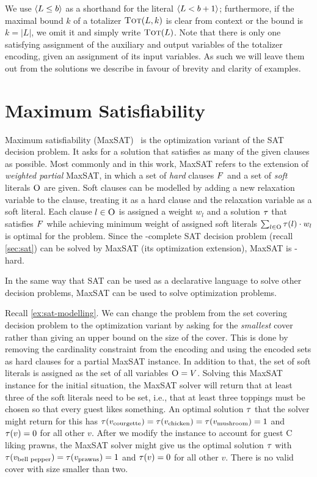 We use $\langle L \leq b \rangle$ as a shorthand for the literal $\langle L < b+1 \rangle$;
furthermore, if the maximal bound $k$ of a totalizer $\textsc{Tot}(L,k)$ is clear from context or the bound is $k=|L|$, we omit it and simply write $\textsc{Tot}(L)$.
Note that there is only one satisfying assignment of the auxiliary and output variables of the totalizer encoding, given an assignment of its input variables.
As such we will leave them out from the solutions we describe in favour of brevity and clarity of examples. 

\section{Maximum Satisfiability\label{sec:max-sat}}

Maximum satisfiability (MaxSAT)~\autocite{handbook2-maxsat} is the optimization variant of the SAT decision problem.
It asks for a solution that satisfies as many of the given clauses as possible.
Most commonly and in this work, MaxSAT refers to the extension of \emph{weighted partial} MaxSAT, in which a set of \emph{hard} clauses $F$ and a set of \emph{soft} literals $\textsc{O}$ are given.
Soft clauses can be modelled by adding a new relaxation variable to the clause, treating it as a hard clause and the relaxation variable as a soft literal.
Each clause $l \in \textsc{O}$ is assigned a weight $w_l$ and a solution $\tau$ that satisfies $F$ while achieving minimum weight of assigned soft literals $\sum_{l \in \textsc{O}} \tau(l) \cdot w_l$ is optimal for the problem.
Since the \NP-complete SAT decision problem (recall \cref{sec:sat}) can be solved by MaxSAT (its optimization extension), MaxSAT is \NP-hard.

In the same way that SAT can be used as a declarative language to solve other decision problems, MaxSAT can be used to solve optimization problems.

\begin{example}\label{ex:maxsat-modelling}
  Recall \cref{ex:sat-modelling}.
  We can change the problem from the set covering decision problem to the optimization variant by asking for the \emph{smallest} cover rather than giving an upper bound on the size of the cover.
  This is done by removing the cardinality constraint from the encoding and using the encoded sets as hard clauses for a partial MaxSAT instance.
  In addition to that, the set of soft literals is assigned as the set of all variables $\textsc{O} = V$.
  Solving this MaxSAT instance for the initial situation, the MaxSAT solver will return that at least three of the soft literals need to be set, i.e., that at least three toppings must be chosen so that every guest likes something.
  An optimal solution $\tau$ that the solver might return for this has $\tau(v_\text{courgette}) = \tau(v_\text{chicken}) = \tau(v_\text{mushroom}) = 1$ and $\tau(v) = 0$ for all other $v$.
  After we modify the instance to account for guest C liking prawns, the MaxSAT solver might give us the optimal solution $\tau$ with $\tau(v_\text{bell pepper}) = \tau(v_\text{prawns}) = 1$ and $\tau(v) = 0$ for all other $v$.
  There is no valid cover with size smaller than two.
\end{example}

